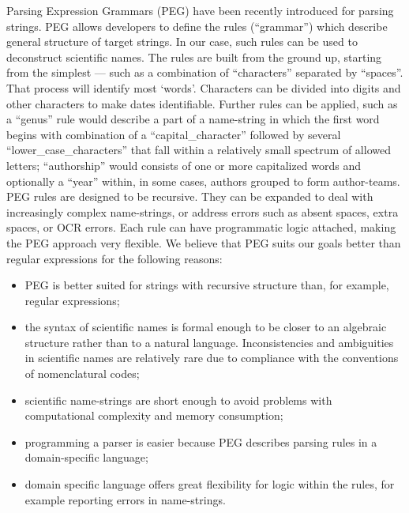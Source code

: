 \documentclass{bmcart}
\begin{document}
Parsing Expression Grammars (PEG) \cite{Ford2004} have been recently introduced
for parsing strings. PEG allows developers to define the rules (``grammar'')
which describe general structure of target strings. In our case, such rules can
be used to deconstruct scientific names.  The rules are built from the ground
up, starting from the simplest --- such as a combination of ``characters''
separated by ``spaces''.  That process will identify most `words'.  Characters
can be divided into digits and other characters to make dates identifiable.
Further rules can be applied, such as a ``genus'' rule would describe a part of
a name-string in which the first word begins with combination of a
``capital\_character'' followed by several ``lower\_case\_characters'' that
fall within a relatively small spectrum of allowed letters; ``authorship''
would consists of one or more capitalized words and optionally a ``year''
within, in some cases, authors grouped to form author-teams. PEG rules are
designed to be recursive. They can be expanded to deal with increasingly
complex name-strings, or address errors such as absent spaces, extra spaces, or
OCR errors. Each rule can have programmatic logic attached, making the PEG
approach very flexible. We believe that PEG suits our goals better than regular
expressions for the following reasons:

\begin{itemize}

  \item PEG is better suited for strings with recursive structure than, for
    example, regular expressions;

  \item the syntax of scientific names is formal enough to be closer to an
    algebraic structure rather than to a natural language. Inconsistencies and
    ambiguities in scientific names are relatively rare due to compliance with
    the conventions of nomenclatural codes;

  \item scientific name-strings are short enough to avoid problems with
    computational complexity and memory consumption;

  \item programming a parser is easier because PEG describes parsing rules in
    a domain-specific language;

  \item domain specific language offers great flexibility for logic within the
    rules, for example reporting errors in name-strings.

\end{itemize}
\end{document}
